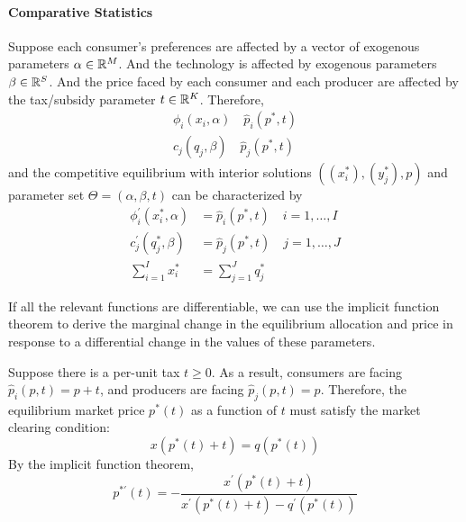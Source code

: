 \documentclass{report}
\begin{document}
	 	\paragraph{Comparative Statistics} Suppose each consumer's preferences are affected by a vector of exogenous parameters $\alpha \in \mathbb{R}^M$. And the technology is affected by exogenous parameters $\beta \in \mathbb{R}^S$. And the price faced by each consumer and each producer are affected by the tax/subsidy parameter $t \in \mathbb{R}^K$. Therefore,
	 	\begin{align}
	 		\phi_i(x_i, \alpha) \quad
	 		\hat{p}_i(p^*, t)\\
	 		c_j(q_j, \beta) \quad
	 		\hat{p}_j(p^*, t)
	 	\end{align}
	 	and the competitive equilibrium with interior solutions $((x^*_i), (y^*_j), p)$ and parameter set $\Theta = (\alpha, \beta, t)$ can be characterized by
	 	\begin{align}
	 		\phi_{i}^{\prime}\left(x_{i}^{*}, \alpha\right)&=\hat{p}_{i}\left(p^{*}, t\right) \quad i=1, \dots, I \\
	 		c_{j}^{\prime}\left(q_{j}^{*}, \beta\right)&=\hat{p}_{j}\left(p^{*}, t\right) \quad j=1, \ldots, J \\
	 		\sum_{i=1}^{I} x_{i}^{*}&=\sum_{j=1}^{J} q_{j}^{*}
	 	\end{align}
	 	
	 	\begin{remark}
	 		If all the relevant functions are differentiable, we can use the implicit function theorem to derive the marginal change in the equilibrium allocation and price in response to a differential change in the values of these parameters.
	 	\end{remark}
	 	
	 	\begin{example}
	 		Suppose there is a per-unit tax $t \geq 0$. As a result, consumers are facing $\hat{p}_i(p, t) = p + t$, and producers are facing $\hat{p}_j(p, t) = p$. Therefore, the equilibrium market price $p^*(t)$ as a function of $t$ must satisfy the market clearing condition:
	 		\begin{equation}
	 			x\left(p^{*}(t)+t\right)=q\left(p^{*}(t)\right)
	 		\end{equation}
	 		By the implicit function theorem,
	 		\begin{equation}
	 			p^{* \prime}(t)=-\frac{x^{\prime}\left(p^{*}(t)+t\right)}{x^{\prime}\left(p^{*}(t)+t\right)-q^{\prime}\left(p^{*}(t)\right)}
	 		\end{equation}
	 	\end{example}
	 	
\end{document}
